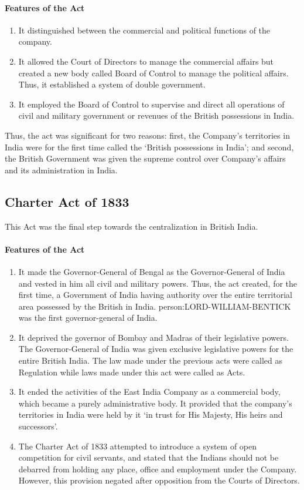 \begin{multicols}{2}
\paragraph{Features of the Act}
\begin{enumerate}
  \item It distinguished between the commercial and political functions of the company.
  \item It allowed the Court of Directors to manage the commercial affairs but created a new body called Board of Control to manage the political affairs. Thus, it established a system of double government.
  \item It employed the Board of Control to supervise and direct all operations of civil and military government or revenues of the British possessions in India.
\end{enumerate}

Thus, the act was significant for two reasons: first, the Company's territories in India were for the first time called the `British possessions in India'; and second, the British Government was given the supreme control over Company's affairs and its administration in India.

\subsection{Charter Act of 1833}
This Act was the final step towards the centralization in British India.

\paragraph{Features of the Act}
\begin{enumerate}
  \item It made the Governor-General of Bengal as the Governor-General of India and vested in him all civil and military powers. Thus, the act created, for the first time, a Government of India having authority over the entire territorial area possessed by the British in India. \gls{person:LORD-WILLIAM-BENTICK} was the first governor-general of India.
  \item It deprived the governor of Bombay and Madras of their legislative powers. The Governor-General of India was given exclusive legislative powers for the entire British India. The law made under the previous acts were called as Regulation while laws made under this act were called as Acts.
  \item It ended the activities of the East India Company as a commercial body, which became a purely administrative body. It provided that the company's territories in India were held by it `in trust for His Majesty, His heirs and successors'.
  \item The Charter Act of 1833 attempted to introduce a system of open competition for civil servants, and stated that the Indians should not be debarred from holding any place, office and employment under the Company. However, this provision negated after opposition from the Courts of Directors.
\end{enumerate}


\end{multicols}
